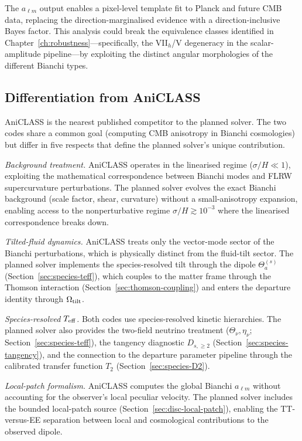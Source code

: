 The $a_{\ell m}$ output enables a pixel-level template
fit to Planck and future CMB data, replacing the
direction-marginalised evidence with a
direction-inclusive Bayes factor.  This analysis could
break the equivalence classes identified in
Chapter~\ref{ch:robustness}---specifically, the
VII$_h$/V degeneracy in the scalar-amplitude pipeline---by
exploiting the distinct angular morphologies of the
different Bianchi types.


\subsection{Differentiation from AniCLASS}
\label{sec:differentiation}

AniCLASS is the nearest published competitor to the
planned solver.  The two codes share a common goal
(computing CMB anisotropy in Bianchi cosmologies) but
differ in five respects that define the planned solver's
unique contribution.

\emph{Background treatment.}  AniCLASS operates in the
linearised regime ($\sigma/H \ll 1$), exploiting the
mathematical correspondence between Bianchi modes and
FLRW supercurvature perturbations.  The planned solver
evolves the exact Bianchi background (scale factor,
shear, curvature) without a small-anisotropy expansion,
enabling access to the nonperturbative regime
$\sigma/H \gtrsim 10^{-3}$ where the linearised
correspondence breaks down.

\emph{Tilted-fluid dynamics.}  AniCLASS treats only the
vector-mode sector of the Bianchi perturbations, which is
physically distinct from the fluid-tilt sector.  The
planned solver implements the species-resolved tilt
through the dipole $\Theta^{(s)}_a$
(Section~\ref{sec:species-teff}), which couples to the
matter frame through the Thomson interaction
(Section~\ref{sec:thomson-coupling}) and enters the
departure identity through $\Omega_{\mathrm{tilt}}$.

\emph{Species-resolved $T_{\mathrm{eff}}$.}  Both codes use
species-resolved kinetic hierarchies.  The planned solver
also provides the two-field neutrino treatment
($\Theta_\nu, \eta_\nu$;
Section~\ref{sec:species-teff}), the tangency diagnostic
$D_{s,\geq 2}$
(Section~\ref{sec:species-tangency}), and the connection
to the departure parameter pipeline through the
calibrated transfer function $T_2$
(Section~\ref{sec:species-D2}).

\emph{Local-patch formalism.}  AniCLASS computes the
global Bianchi $a_{\ell m}$ without accounting for the
observer's local peculiar velocity.  The planned solver
includes the bounded local-patch source
(Section~\ref{sec:disc-local-patch}), enabling the
TT-versus-EE separation between local and cosmological
contributions to the observed dipole.


